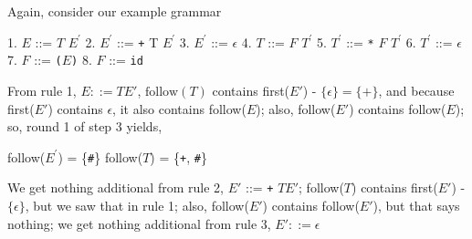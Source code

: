 \documentclass[8pt,a4paper,compress]{beamer}
\newcommand{\mm}[1]{$#1$}
\newcommand{\expo}[2]{$#1^{#2}$}
\newenvironment{spaced}
{
\smallskip
\hspace{.5cm}
\begin{minipage}[c]{\textwidth}
}
{
\end{minipage}
\smallskip
}
\begin{document}
\begin{frame}[fragile]
\pause

Again, consider our example grammar

\text{ }
\begin{spaced}
\begin{production}
1. \mm{E}  ::= \mm{T} \expo{E}{\prime}
2. \expo{E}{\prime} ::= \lstinline{+} T \expo{E}{\prime}
3. \expo{E}{\prime} ::= \mm{\epsilon}
4. \mm{T}  ::= \mm{F} \expo{T}{\prime}
5. \expo{T}{\prime} ::= \lstinline{*} \mm{F} \expo{T}{\prime}
6. \expo{T}{\prime} ::= \mm{\epsilon}
7. \mm{F}  ::= \lstinline{(}\mm{E}\lstinline{)}
8. \mm{F}  ::= \lstinline{id}
\end{production}
\end{spaced}

\pause

From rule 1, $E  ::= T E'$,  $\text{follow}(T)$ contains first($E'$) - $\{\epsilon\} = \{+\}$, and because first($E'$) contains $\epsilon$, it also contains follow($E$); also, follow($E'$) contains follow($E$); so, round 1 of step 3 yields,

\text{ }
\begin{spaced}
\begin{production}
follow(\expo{E}{\prime}) = \{\lstinline{#}\}
follow(\mm{T})  = \{\lstinline{+}, \lstinline{#}\}
\end{production}
\end{spaced}

\pause

We get nothing additional from rule 2, $E'$ ::= \lstinline{+} $T E'$; follow($T$) contains first($E'$) - $\{\epsilon\}$, but we saw that in rule 1; also, follow($E'$) contains follow($E'$), but that says nothing; we get nothing additional from rule 3, $E' ::= \epsilon$
\end{frame}
\end{document}
